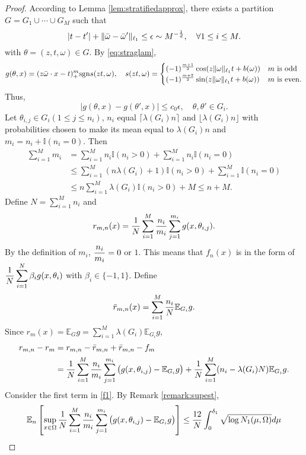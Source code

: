 \begin{proof}
According to Lemma \ref{lem:stratifiedapprox}, there exists a partition $G=G_1\cup \cdots \cup G_M$ such that
$$
|t -t'| + \|\bar\omega - \bar\omega'\|_{\ell_1}\leq \epsilon \sim  M^{-{1\over d}},\quad \forall 1\le i\le M.
$$
with $\theta=(z, t, \omega)\in G$. By \eqref{eq:straglam},
$$
g(\theta, x)= (z\bar \omega\cdot x - t)_+^m {\rm sgn} s(zt,\omega),\quad s(zt,\omega)= 
\begin{cases}
(-1)^{m+1\over 2}\cos(z\|\omega\|_{\ell_1}t + b(\omega)) & m \text{ is odd}
\\
(-1)^{m+2\over 2}\sin(z\|\omega\|_{\ell_1}t + b(\omega)) & m \text{ is even}.
\end{cases}
$$
Thus,
$$
|g(\theta,x) - g(\theta',x)|\le c_0\epsilon,\quad \theta, \theta'\in G_i.
$$
Let  $\theta_{i,j} \in G_i(1\leq j\leq n_i)$,  $n_i$ equal $\lceil \lambda(G_i)n\rceil$ and $\lfloor \lambda(G_i)n\rfloor$ with probabilities chosen to make its mean equal to $\lambda(G_i)n$ and $m_i=n_i + \mathbb{I}(n_i=0)$. Then
\begin{align} 
\sum_{i=1}^M m_i&=\sum_{i=1}^M n_i\mathbb{I}(n_i>0) + \sum_{i=1}^M n_i\mathbb{I}(n_i=0)
\\
&\le \sum_{i=1}^M (n\lambda(G_i) + 1)\mathbb{I}(n_i>0) + \sum_{i=1}^M \mathbb{I}(n_i=0)
\\
&\le  n\sum_{i=1}^M \lambda(G_i)\mathbb{I}(n_i>0) + M
\le n+M.
\end{align} 
Define $\displaystyle N=\sum_{i=1}^Mn_i$  and
$$
r_{m,n}(x)= {1\over N}\sum_{i=1}^M {n_i\over m_i} \sum_{j=1}^{m_i} g(x,\theta_{i,j}).
$$
By the definition of $m_i$, $\displaystyle {n_i\over m_i}=0$ or $1$.  This means that $f_n(x) $ is in the form of  $\displaystyle {1\over N}\sum_{i=1}^N\beta_i g(x,\theta_i)$ with $\beta_i\in \{-1, 1\}$. Define
$$
\bar{r}_{m,n}(x)= \sum_{i=1}^M {n_i\over N}\mathbb{E}_{G_i}g.
$$
Since
$
\displaystyle r_m(x)=\mathbb{E}_G g= \sum_{i=1}^M \lambda(G_i) \mathbb{E}_{G_i}g,
$  
\begin{align}  
r_{m,n} - r_m  &= r_{m,n} - \bar{r}_{m,n} + \bar{r}_{m,n} - f_m
\\
&= {1\over N}\sum_{i=1}^M {n_i\over m_i} \sum_{j=1}^{m_i} \big (g(x,\theta_{i,j}) - \mathbb{E}_{G_i}g \big ) + {1\over N}\sum_{i=1}^M (n_i - \lambda(G_i)N)  \mathbb{E}_{G_i}g.\label{f1}
\end{align} 
Consider the first term in \eqref{f1}. By Remark \eqref{remark:supest},
\begin{align}  
\mathbb{E}_n \left[ \sup_{x\in \Omega}{1\over N}\sum_{i=1}^M {n_i\over m_i} \sum_{j=1}^{m_i} \big (g(x,\theta_{i,j}) - \mathbb{E}_{G_i}g \big )\right] \le {12\over N}\int_0^{\delta_1} \sqrt{\log N_1(\mu, \Omega)}d\mu

\end{align}
\end{proof}
